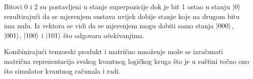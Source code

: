 Bitovi 0 i 2 su postavljeni u stanje superpozicije dok je bit 1 ostao u stanju $\ket{0}$ rezultirajući da se mjerenjem sustava uvijek dobije stanje koje na drugom bitu ima nulu. Iz vektora se vidi da se mjerenjem mogu dobiti samo stanja $\ket{000}$, $\ket{001}$, $\ket{100}$ i $\ket{101}$ što odgovara očekivanjima.

Kombinirajući tenzorski produkt i matrično množenje može se izračunati matrična reprezentacija svakog kvantnog logičkog kruga što je u suštini točno ono što simulator kvantnog računala i radi.



